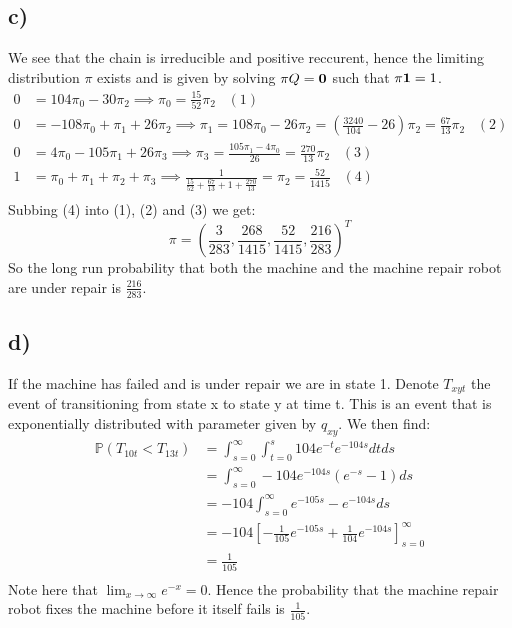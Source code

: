 \documentclass{article}
\begin{document}
\subsection*{c)}
We see that the chain is irreducible and positive reccurent, hence the limiting distribution $\pi$ exists and is given by solving $\pi Q=\bold{0}$ such that $\pi\bold{1}=1$.
\begin{align*}
0&=104\pi_0-30\pi_2\implies \pi_0=\frac{15}{52}\pi_2\;\;\;(1)\\
0&=-108\pi_0+\pi_1+26\pi_2\implies\pi_1=108\pi_0-26\pi_2=(\frac{3240}{104}-26)\pi_2=\frac{67}{13}\pi_2\;\;\;(2)\\
0&=4\pi_0-105\pi_1+26\pi_3\implies\pi_3=\frac{105\pi_1-4\pi_0}{26}=\frac{270}{13}\pi_2\;\;\;(3)\\
1&=\pi_0+\pi_1+\pi_2+\pi_3\implies \frac{1}{\frac{15}{52}+\frac{67}{13}+1+\frac{270}{13}}=\pi_2=\frac{52}{1415}\;\;\;(4)\\
\end{align*}
Subbing (4) into (1), (2) and (3) we get:
$$\pi=\left(\frac{3}{283},\frac{268}{1415},\frac{52}{1415},\frac{216}{283}\right)^T$$
So the long run probability that both the machine and the machine repair
robot are under repair is $\frac{216}{283}$.
\subsection*{d)}
If the machine has failed and is under repair we are in state 1. Denote $T_{xyt}$ the event of transitioning from state x to state y at time t. This is an event that is exponentially distributed with parameter given by $q_{xy}$. We then find:
\begin{align*}
\mathbb{P}(T_{10t}<T_{13t})&=\int_{s=0}^{\infty}\int_{t=0}^{s}104e^{-t}e^{-104s}dtds\\
&=\int_{s=0}^{\infty}-104e^{-104s}(e^{-s}-1)ds\\
&=-104\int_{s=0}^{\infty}e^{-105s}-e^{-104s}ds\\
&=-104\left[-\frac{1}{105}e^{-105s}+\frac{1}{104}e^{-104s}\right]_{s=0}^{\infty}\\
&=\frac{1}{105}\\
\end{align*}
Note here that $\lim_{x\rightarrow\infty}e^{-x}=0$. Hence the probability that the machine repair robot fixes the machine before it itself fails is $\frac{1}{105}$.
\end{document}
